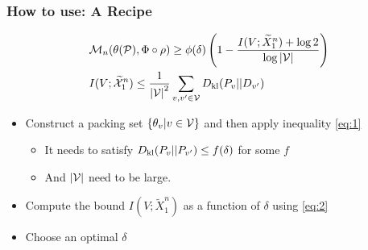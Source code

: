 \documentclass[10pt,xcolor={usenames,dvipsnames,table},aspectratio=169]{beamer}
\begin{document}
\begin{frame}
    \frametitle{How to use: A Recipe}
    \begin{align}
    &\mathcal{M}_n(\theta(\mathcal{P}), \Phi \circ \rho) \geq \phi(\delta) \left( 1 - \dfrac{I(V; \widetilde{X}_1^{n}) + \log 2}{\log \left\lvert\mathcal{V}\right\rvert} \right) \label{eq:1} \\ 
    &I(V; \widetilde{\mathcal{X}}_1^{n}) \leq \dfrac{1}{\left\lvert\mathcal{V}\right\rvert^2} \sum_{v, v' \in \mathcal{V}} D_{\rm kl}(P_v || D_{v'}) \label{eq:2}
    \end{align} 
    \begin{itemize} 
        \item Construct a packing set $\left\{\theta_v| v\in \mathcal{V}\right\}$ and then apply inequality  \eqref{eq:1}
            \begin{itemize}
                \item It needs to satisfy $D_{\rm kl}(P_v ||P_{v'}) \leq f(\delta)$ for some $f$
                \item And $\left\lvert\mathcal{V}\right\rvert$ need to be large.
            \end{itemize}
        \item Compute the bound $I(V; \widetilde{X}_1^{n})$ as a function of $\delta$ using \eqref{eq:2}
        \item Choose an optimal $\delta$
    \end{itemize}
\end{frame}
\end{document}
